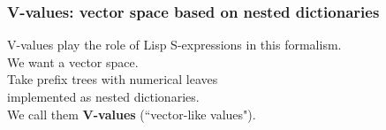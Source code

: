 \documentclass{beamer}
\newcommand{\msmagenta}[1]{{\color{mymagenta} #1}}
\begin{document}
\begin{frame}

  \frametitle{\msmagenta{V-values: vector space based on nested dictionaries}}


V-values play the role of Lisp S-expressions in this formalism.\\[3ex]


We want a vector space.\\[3ex]

Take prefix trees with numerical leaves\\ implemented as nested dictionaries.\\[3ex]

We call them {\bf V-values}
(``vector-like values").\\[3ex]


\end{frame}
\end{document}
